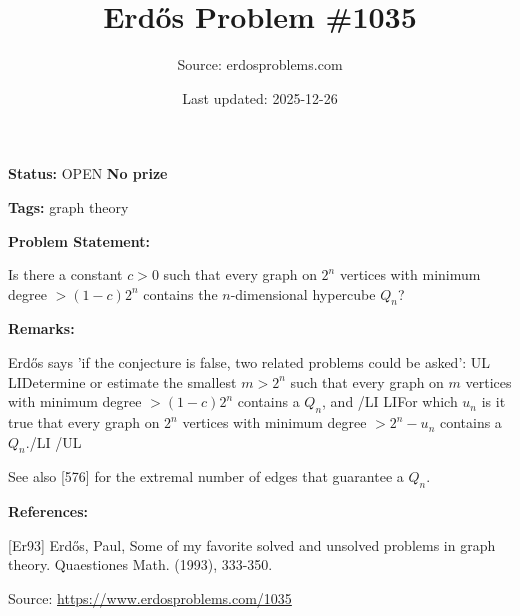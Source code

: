 \documentclass{article}
\title{Erd\H{o}s Problem \#1035}
\date{Last updated: 2025-12-26}
\author{Source: erdosproblems.com}
\begin{document}
\maketitle

\noindent\textbf{Status:} OPEN \quad \textbf{No prize}

\noindent\textbf{Tags:} graph theory

\medskip
\noindent\textbf{Problem Statement:}

Is there a constant $c>0$ such that every graph on $2^n$ vertices with minimum degree $>(1-c)2^n$ contains the $n$-dimensional hypercube $Q_n$?

\bigskip
\noindent\textbf{Remarks:}

Erd\H{o}s \cite{Er93} says 'if the conjecture is false, two related problems could be asked':
{UL}
{LI}Determine or estimate the smallest $m>2^n$ such that every graph on $m$ vertices with minimum degree $>(1-c)2^n$ contains a $Q_n$, and {/LI}
{LI}For which $u_n$ is it true that every graph on $2^n$ vertices with minimum degree $>2^n-u_n$ contains a $Q_n$.{/LI}
{/UL}

See also [576] for the extremal number of edges that guarantee a $Q_n$.

\bigskip
\noindent\textbf{References:}

[Er93] Erd\H{o}s, Paul, Some of my favorite solved and unsolved problems in graph theory. Quaestiones Math. (1993), 333-350.

\bigskip
\noindent\small{Source: \url{https://www.erdosproblems.com/1035}}
\end{document}
